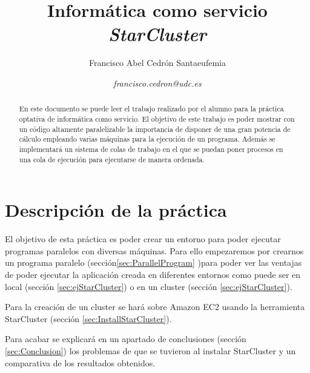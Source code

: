 \documentclass{article}
\title{\textbf{Informática como servicio}
\\ \textbf{\emph{StarCluster}}
}
\author{Francisco Abel Cedrón Santaeufemia \and \textit{francisco.cedron@udc.es}}
\date{} %
\begin{document}
\maketitle %
\renewcommand{\abstractname}{Abstract} %
\begin{abstract}
	En este documento se puede leer el trabajo realizado por el alumno para la práctica optativa de informática como servicio. El objetivo de este trabajo es poder mostrar con un código altamente paralelizable la importancia de disponer de una gran potencia de cálculo empleando varias máquinas para la ejecución de un programa. Además se implementará un sistema de colas de trabajo en el que se puedan poner procesos en una cola de ejecución para ejecutarse de manera ordenada.
\end{abstract}
\renewcommand{\contentsname}{} %
{\setlength{\parskip}{0mm} \tableofcontents} %

\section{Descripción de la práctica}
	El objetivo de esta práctica es poder crear un entorno para poder ejecutar programas paralelos con diversas máquinas. Para ello empezaremos por crearnos un programa paralelo (sección\ref{sec:ParallelProgram} )para poder ver las ventajas de poder ejecutar la aplicación creada en diferentes entornos como puede ser en local (sección \ref{sec:ejStarCluster}) o en un cluster (sección \ref{sec:ejStarCluster}).
	
	Para la creación de un cluster se hará sobre Amazon EC2 usando la herramienta StarCluster (sección \ref{sec:InstallStarCluster}).
	
	Para acabar se explicará en un apartado de conclusiones (sección \ref{sec:Conclusion}) los problemas de que se tuvieron al instalar StarCluster y un comparativa de los resultados obtenidos.
	
\end{document}
